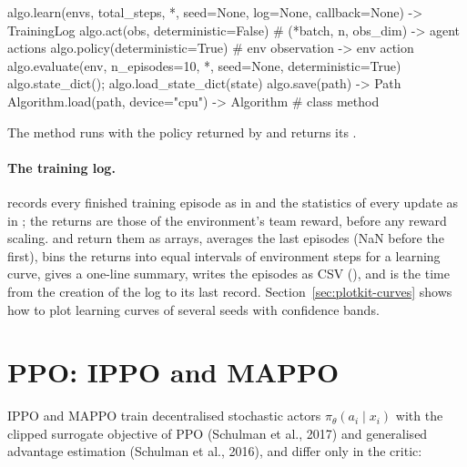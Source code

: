 \begin{pycode}
algo.learn(envs, total_steps, *, seed=None, log=None,
           callback=None) -> TrainingLog
algo.act(obs, deterministic=False)   # (*batch, n, obs_dim) -> agent actions
algo.policy(deterministic=True)      # env observation -> env action
algo.evaluate(env, n_episodes=10, *, seed=None, deterministic=True)
algo.state_dict(); algo.load_state_dict(state)
algo.save(path) -> Path
Algorithm.load(path, device="cpu") -> Algorithm      # class method
\end{pycode}
The method  runs  with the policy
returned by  and returns its .

\paragraph{The training log.}  records every finished
training episode as  in
 and the statistics of every update as
 in ; the returns are those of
the environment's team reward, before any reward scaling.
 and  return them as arrays,
 averages the last episodes (NaN before the
first),  bins the returns into equal intervals of
environment steps for a learning curve,  gives a one-line
summary,  writes the episodes as CSV
(), and  is the time from the
creation of the log to its last record. Section~\ref{sec:plotkit-curves} shows how to plot learning
curves of several seeds with confidence bands.

\section{PPO: IPPO and MAPPO}\label{sec:marl-ppo}

IPPO and MAPPO train decentralised stochastic actors $\pi_\theta(a_i \mid x_i)$
with the clipped surrogate objective of PPO (Schulman et al., 2017) and
generalised advantage estimation (Schulman et al., 2016), and differ only in
the critic:

